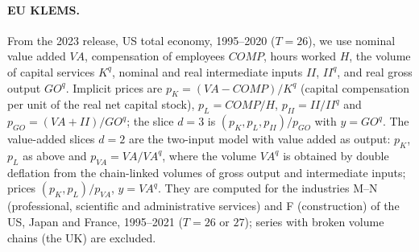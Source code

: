 \paragraph{EU KLEMS.} From the 2023 release, US total economy, 1995--2020 ($T=26$), we use nominal value added $VA$, compensation of employees $COMP$, hours worked $H$, the volume of capital services $K^q$, nominal and real intermediate inputs $II$, $II^q$, and real gross output $GO^q$. Implicit prices are $p_K=(VA-COMP)/K^q$ (capital compensation per unit of the real net capital stock), $p_L=COMP/H$, $p_{II}=II/II^q$ and $p_{GO}=(VA+II)/GO^q$; the slice $d=3$ is $(p_K,p_L,p_{II})/p_{GO}$ with $y=GO^q$. The value-added slices $d=2$ are the two-input model with value added as output: $p_K$, $p_L$ as above and $p_{VA}=VA/VA^q$, where the volume $VA^q$ is obtained by double deflation from the chain-linked volumes of gross output and intermediate inputs; prices $(p_K,p_L)/p_{VA}$, $y=VA^q$. They are computed for the industries M--N (professional, scientific and administrative services) and F (construction) of the US, Japan and France, 1995--2021 ($T=26$ or $27$); series with broken volume chains (the UK) are excluded.

